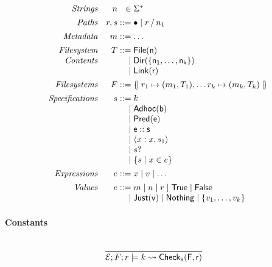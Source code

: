 \documentclass[nocopyrightspace,natbib]{sigplanconf}
\begin{document}
\[
\begin{array}{rr@{\;}r@{\;}l}
\textit{Strings}        & n & \in & \Sigma^{\ast} \\[1ex]
\textit{Paths}          & r,s & \bnfdef & \PNil \mid \PCons{r}{n_1} \\[1ex]
\textit{Metadata}       & m  & \bnfdef & \dots\\[1ex]
\textit{Filesystem}     & T  & \bnfdef & \File{n} \\
\textit{Contents}       &    & \bnfalt & \Dir{ \Set{n_1,\dots,n_k} }\\
                        &    & \bnfalt & \Link{r}\\[1ex]
\textit{Filesystems}    & F & \bnfdef & \Map{ r_1 \mapsto (m_1,T_1), \dots r_k \mapsto (m_k,T_k) }\\[1ex]
\textit{Specifications} & s & \bnfdef & k \\
                        &   & \bnfalt & \SAdhoc{b}\\
                        &   & \bnfalt & \SPred{e}\\
                        &   & \bnfalt & \SPath{e}{s}\\
                        &   & \bnfalt & \SPair{x}{s_1}{s_2}\\
                        &   & \bnfalt & \SOption{s}\\
                        &   & \bnfalt & \SSetComp{s}{x}{e}\\[1ex]
\textit{Expressions}    & e & \bnfdef & x \bnfalt v \bnfalt \dots \\[1ex]
\textit{Values}         & e & \bnfdef & m \bnfalt n \bnfalt r \bnfalt \True \bnfalt \False \\
                        &   & \bnfalt & \Just{v} \bnfalt \Nothing \bnfalt \{ v_1,\dots,v_k \}\\
\end{array}
\]


\paragraph*{Constants}
\[
{{\displaystyle\strut{ }}\over{\displaystyle\strut{ \ensuremath{\mathcal{E}};F;r \models k \ensuremath{\rightsquigarrow}\ensuremath{\mathsf{Check_k(F,r)}} }}}\quad{\displaystyle{}}
\]
\end{document}
